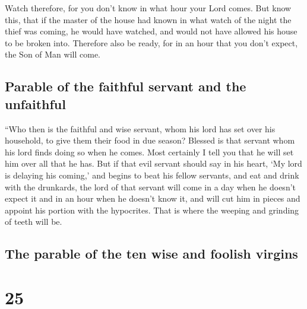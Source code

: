  Watch therefore, for you don't know in what hour your
Lord comes.  But know this, that if the master of the
house had known in what watch of the night the thief was coming, he
would have watched, and would not have allowed his house to be broken
into.  Therefore also be ready, for in an hour that you
don't expect, the Son of Man will come.

\hypertarget{parable-of-the-faithful-servant-and-the-unfaithful}{%
\subsection{Parable of the faithful servant and the
unfaithful}\label{parable-of-the-faithful-servant-and-the-unfaithful}}

 ``Who then is the faithful and wise servant, whom his
lord has set over his household, to give them their food in due season?
 Blessed is that servant whom his lord finds doing so
when he comes.  Most certainly I tell you that he will
set him over all that he has.  But if that evil servant
should say in his heart, `My lord is delaying his coming,'
 and begins to beat his fellow servants, and eat and
drink with the drunkards,  the lord of that servant will
come in a day when he doesn't expect it and in an hour when he doesn't
know it,  and will cut him in pieces and appoint his
portion with the hypocrites. That is where the weeping and grinding of
teeth will be.

\hypertarget{the-parable-of-the-ten-wise-and-foolish-virgins}{%
\subsection{The parable of the ten wise and foolish
virgins}\label{the-parable-of-the-ten-wise-and-foolish-virgins}}

\hypertarget{section-24}{%
\section{25}\label{section-24}}

